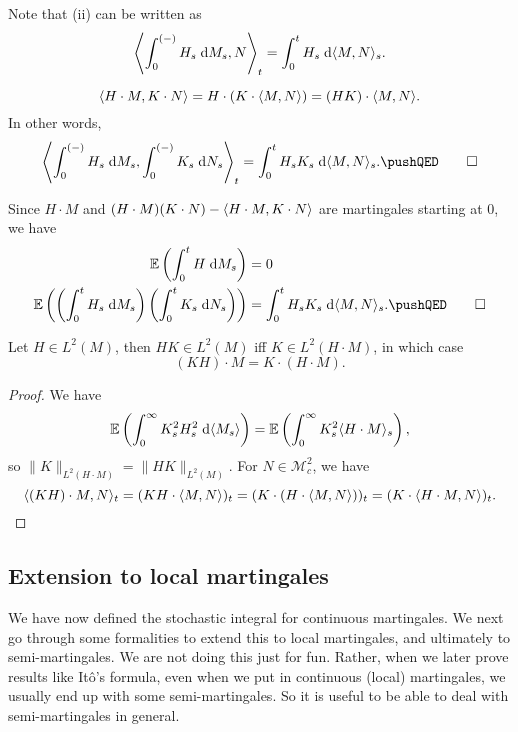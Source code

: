 \documentclass[a4paper]{article}
\begin{document}
Note that (ii) can be written as
\[
  \left\langle \int_0^{(-)} H_s \;\mathrm{d} M_s, N\right\rangle_t = \int_0^t H_s \;\mathrm{d} \langle M, N\rangle_s.
\]
\begin{cor}
  \[
    \langle H \cdot M, K \cdot N\rangle = H \cdot (K \cdot \langle M, N\rangle) = (HK) \cdot \langle M, N\rangle.
  \]
  In other words,
  \[
    \left\bra \int_0^{(-)} H_s \;\d M_s, \int_0^{(-)} K_s\;\d N_s\right\ket_t = \int_0^t H_s K_s \;\d \bra M, N\ket_s.\fakeqed
  \]
\end{cor}

\begin{cor}
  Since $H \cdot M$ and $(H \cdot M)(K \cdot N) - \langle H \cdot M, K \cdot N\rangle$ are martingales starting at $0$, we have
  \begin{align*}
    \E \left(\int_0^t H\;\d M_s\right) &= 0\\
    \E \left(\left(\int_0^t H_s \;\d M_s\right) \left(\int_0^t K_s \;\d N_s \right)\right) &= \int_0^t H_s K_s \;\d \bra M, N\ket_s.\fakeqed
  \end{align*}
\end{cor}

\begin{cor}
  Let $H \in L^2 (M)$, then $HK \in L^2(M)$ iff $K \in L^2(H \cdot M)$, in which case
  \[
    (KH) \cdot M = K \cdot (H \cdot M).
  \]
\end{cor}

\begin{proof}
  We have
  \[
    \mathbb{E} \left(\int_0^\infty K_s^2 H_s^2 \;\mathrm{d} \langle M_s\rangle\right) = \mathbb{E} \left(\int_0^\infty K_s^2 \langle H \cdot M\rangle_s \right),
  \]
  so $\|K\|_{L^2(H \cdot M)} = \|HK\|_{L^2(M)}$. For $N \in \mathcal{M}_c^2$, we have
  \[
    \langle (KH) \cdot M, N\rangle_t = (KH \cdot \langle M, N\rangle)_t = (K \cdot (H \cdot \langle M, N\rangle))_t = (K \cdot \langle H \cdot M, N\rangle)_t.\qedhere
  \]
\end{proof}

\subsection{Extension to local martingales}
We have now defined the stochastic integral for continuous martingales. We next go through some formalities to extend this to local martingales, and ultimately to semi-martingales. We are not doing this just for fun. Rather, when we later prove results like It\^o's formula, even when we put in continuous (local) martingales, we usually end up with some semi-martingales. So it is useful to be able to deal with semi-martingales in general.
\end{document}
